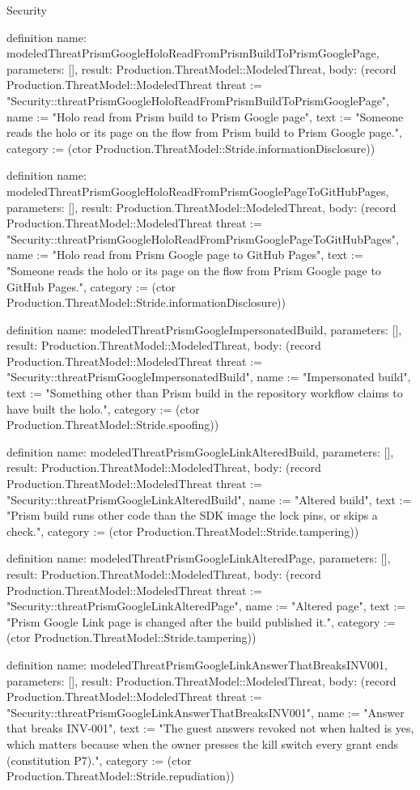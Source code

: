 \begin{lexlean}{Security}
\begin{semanticmodule}
definition{
  name: modeledThreatPrismGoogleHoloReadFromPrismBuildToPrismGooglePage,
  parameters: [],
  result: Production.ThreatModel::ModeledThreat,
  body: (record Production.ThreatModel::ModeledThreat {threat := "Security::threatPrismGoogleHoloReadFromPrismBuildToPrismGooglePage", name := "Holo read from Prism build to Prism Google page", text := "Someone reads the holo or its page on the flow from Prism build to Prism Google page.", category := (ctor Production.ThreatModel::Stride.informationDisclosure)})
}

definition{
  name: modeledThreatPrismGoogleHoloReadFromPrismGooglePageToGitHubPages,
  parameters: [],
  result: Production.ThreatModel::ModeledThreat,
  body: (record Production.ThreatModel::ModeledThreat {threat := "Security::threatPrismGoogleHoloReadFromPrismGooglePageToGitHubPages", name := "Holo read from Prism Google page to GitHub Pages", text := "Someone reads the holo or its page on the flow from Prism Google page to GitHub Pages.", category := (ctor Production.ThreatModel::Stride.informationDisclosure)})
}

definition{
  name: modeledThreatPrismGoogleImpersonatedBuild,
  parameters: [],
  result: Production.ThreatModel::ModeledThreat,
  body: (record Production.ThreatModel::ModeledThreat {threat := "Security::threatPrismGoogleImpersonatedBuild", name := "Impersonated build", text := "Something other than Prism build in the repository workflow claims to have built the holo.", category := (ctor Production.ThreatModel::Stride.spoofing)})
}

definition{
  name: modeledThreatPrismGoogleLinkAlteredBuild,
  parameters: [],
  result: Production.ThreatModel::ModeledThreat,
  body: (record Production.ThreatModel::ModeledThreat {threat := "Security::threatPrismGoogleLinkAlteredBuild", name := "Altered build", text := "Prism build runs other code than the SDK image the lock pins, or skips a check.", category := (ctor Production.ThreatModel::Stride.tampering)})
}

definition{
  name: modeledThreatPrismGoogleLinkAlteredPage,
  parameters: [],
  result: Production.ThreatModel::ModeledThreat,
  body: (record Production.ThreatModel::ModeledThreat {threat := "Security::threatPrismGoogleLinkAlteredPage", name := "Altered page", text := "Prism Google Link page is changed after the build published it.", category := (ctor Production.ThreatModel::Stride.tampering)})
}

definition{
  name: modeledThreatPrismGoogleLinkAnswerThatBreaksINV001,
  parameters: [],
  result: Production.ThreatModel::ModeledThreat,
  body: (record Production.ThreatModel::ModeledThreat {threat := "Security::threatPrismGoogleLinkAnswerThatBreaksINV001", name := "Answer that breaks INV-001", text := "The guest answers revoked not when halted is yes, which matters because when the owner presses the kill switch every grant ends (constitution P7).", category := (ctor Production.ThreatModel::Stride.repudiation)})
}


\end{semanticmodule}
\end{lexlean}
